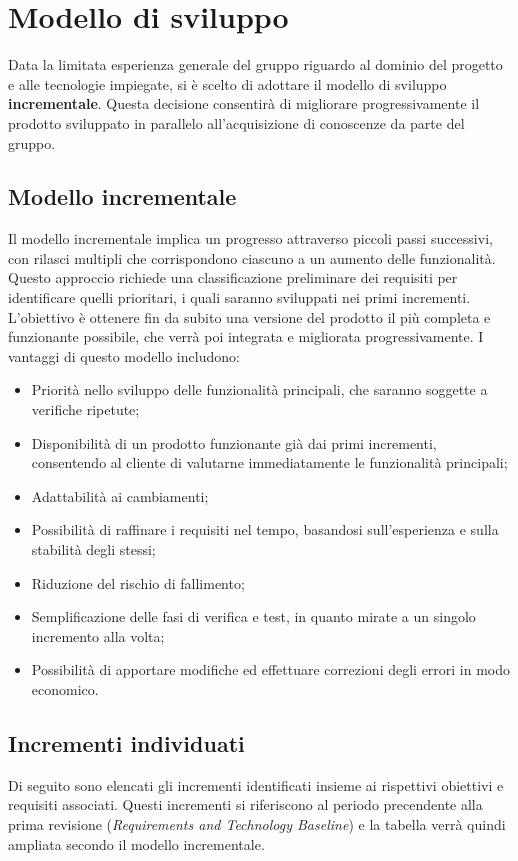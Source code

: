 

\section{Modello di sviluppo}
Data la limitata esperienza generale del gruppo riguardo al dominio del progetto
e alle tecnologie impiegate, si è scelto di adottare il modello di sviluppo \textbf{incrementale}.
Questa decisione consentirà di migliorare progressivamente il prodotto sviluppato in parallelo
all'acquisizione di conoscenze da parte del gruppo.
\subsection{Modello incrementale}
Il modello incrementale implica un progresso attraverso piccoli passi successivi, con rilasci 
multipli che corrispondono ciascuno a un aumento delle funzionalità. Questo approccio richiede una
classificazione preliminare dei requisiti per identificare quelli prioritari, i quali saranno sviluppati 
nei primi incrementi. L'obiettivo è ottenere fin da subito una versione del prodotto il più completa e funzionante
possibile, che verrà poi integrata e migliorata progressivamente. I vantaggi di questo modello includono:
\begin{itemize}
    \item Priorità nello sviluppo delle funzionalità principali, che saranno soggette a verifiche ripetute;
    \item Disponibilità di un prodotto funzionante già dai primi incrementi, consentendo al cliente di valutarne immediatamente le funzionalità principali;
    \item Adattabilità ai cambiamenti;
    \item Possibilità di raffinare i requisiti nel tempo, basandosi sull'esperienza e sulla stabilità degli stessi;
    \item Riduzione del rischio di fallimento;
    \item Semplificazione delle fasi di verifica e test, in quanto mirate a un singolo incremento alla volta;
    \item Possibilità di apportare modifiche ed effettuare correzioni degli errori in modo economico.
\end{itemize}
\subsection{Incrementi individuati}
Di seguito sono elencati gli incrementi identificati insieme ai rispettivi obiettivi e requisiti associati.
Questi incrementi si riferiscono al periodo precendente alla prima revisione (\emph{Requirements and Technology Baseline}) e 
la tabella verrà quindi ampliata secondo il modello incrementale.

